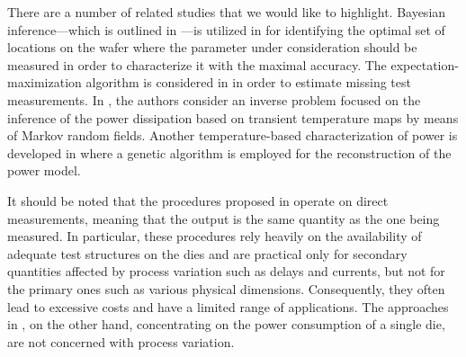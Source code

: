 There are a number of related studies that we would like to highlight. Bayesian
inference---which is outlined in ---is utilized in
\cite{zhang2010} for identifying the optimal set of locations on the wafer where
the parameter under consideration should be measured in order to characterize it
with the maximal accuracy. The expectation-maximization algorithm is considered
in \cite{reda2009} in order to estimate missing test measurements. In
\cite{paek2012}, the authors consider an inverse problem focused on the
inference of the power dissipation based on transient temperature maps by means
of Markov random fields. Another temperature-based characterization of power is
developed in \cite{mesa-martinez2007} where a genetic algorithm is employed for
the reconstruction of the power model.

It should be noted that the procedures proposed in \cite{reda2009, zhang2010}
operate on direct measurements, meaning that the output is the same quantity as
the one being measured. In particular, these procedures rely heavily on the
availability of adequate test structures on the dies and are practical only for
secondary quantities affected by process variation such as delays and currents,
but not for the primary ones such as various physical dimensions. Consequently,
they often lead to excessive costs and have a limited range of applications. The
approaches in \cite{mesa-martinez2007, paek2012}, on the other hand,
concentrating on the power consumption of a single die, are not concerned with
process variation.

